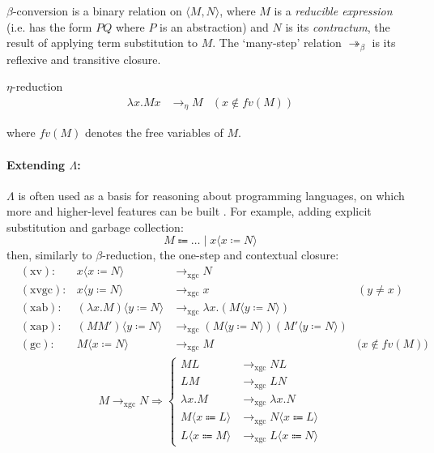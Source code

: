 $\beta$-conversion is a binary relation on $\langle{M,N}\rangle$, where $M$ is a \emph{reducible expression} (i.e. has the form $PQ$ where $P$ is an abstraction) and $N$ is its \emph{contractum}, the result of applying term substitution to $M$. The `many-step' relation $\twoheadrightarrow_{\beta}$ is its reflexive and transitive closure. \cite{tsfpl}

\begin{defn}$\eta$-reduction\label{def:types:eta-reduction}
	$$
	\begin{aligned}
	\lambda{x}.Mx &\to_{\eta} M &(x\notin{fv(M)})
	\end{aligned}
	$$
\end{defn} where $fv(M)$ denotes the free variables of $M$.

\paragraph{Extending $\Lambda$:}\label{bg:types:extending-lambda}

$\Lambda$ is often used as a basis for reasoning about programming languages, on which more and higher-level features can be built \cite{tpl}. For example, adding explicit substitution and garbage collection: $$
M \Coloneqq \dots \mid x\langle{x \coloneqq N}\rangle
$$ then, similarly to $\beta$-reduction, the one-step and contextual closure: \cite{lambda_xgc, tsfpl}
$$
\begin{aligned}
	&(\textrm{xv})\colon &x\langle{x \coloneqq N}\rangle &\to_{\textrm{xgc}} N \\
	&(\textrm{xvgc})\colon &x\langle{y \coloneqq N}\rangle &\to_{\textrm{xgc}} x &(y \neq x) \\
	&(\textrm{xab})\colon &(\lambda{x}.M)\langle{y \coloneqq N}\rangle &\to_{\textrm{xgc}} \lambda{x}.(M\langle{y \coloneqq N}\rangle) \\
	&(\textrm{xap})\colon &(MM')\langle{y \coloneqq N}\rangle &\to_{\textrm{xgc}} (M\langle{y \coloneqq N}\rangle)(M'\langle{y \coloneqq N}\rangle) \\
	&(\textrm{gc})\colon &M\langle{x \coloneqq N}\rangle &\to_{\textrm{xgc}} M &\big(x \notin fv(M)\big)
\end{aligned}
$$$$
\begin{aligned}
	M \to_{\textrm{xgc}} N \Rightarrow \begin{cases}
		ML &\to_{\textrm{xgc}} NL \\
		LM &\to_{\textrm{xgc}} LN \\
		\lambda{x}.M &\to_{\textrm{xgc}} \lambda{x}.N \\
		M\langle{x \Coloneqq L}\rangle &\to_{\textrm{xgc}} N\langle{x \Coloneqq L}\rangle \\
		L\langle{x \Coloneqq M}\rangle &\to_{\textrm{xgc}} L\langle{x \Coloneqq N}\rangle
	\end{cases}
\end{aligned}
$$

